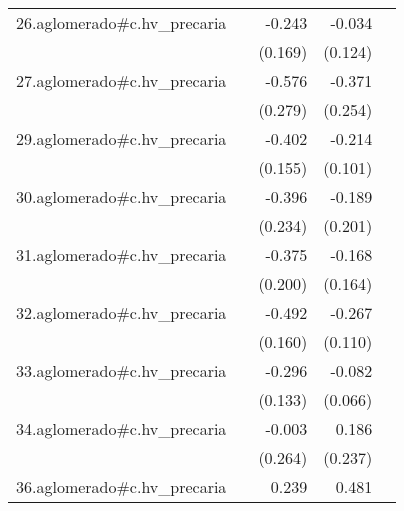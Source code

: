 {\begin{longtable}{l*{4}{D{.}{.}{-1}}}
\addlinespace
26.aglomerado#c.hv\_precaria&                     &      -0.243         &      -0.034         &                     \\
            &                     &     (0.169)         &     (0.124)         &                     \\
\addlinespace
27.aglomerado#c.hv\_precaria&                     &      -0.576\sym{*}  &      -0.371         &                     \\
            &                     &     (0.279)         &     (0.254)         &                     \\
\addlinespace
29.aglomerado#c.hv\_precaria&                     &      -0.402\sym{**} &      -0.214\sym{*}  &                     \\
            &                     &     (0.155)         &     (0.101)         &                     \\
\addlinespace
30.aglomerado#c.hv\_precaria&                     &      -0.396         &      -0.189         &                     \\
            &                     &     (0.234)         &     (0.201)         &                     \\
\addlinespace
31.aglomerado#c.hv\_precaria&                     &      -0.375         &      -0.168         &                     \\
            &                     &     (0.200)         &     (0.164)         &                     \\
\addlinespace
32.aglomerado#c.hv\_precaria&                     &      -0.492\sym{**} &      -0.267\sym{*}  &                     \\
            &                     &     (0.160)         &     (0.110)         &                     \\
\addlinespace
33.aglomerado#c.hv\_precaria&                     &      -0.296\sym{*}  &      -0.082         &                     \\
            &                     &     (0.133)         &     (0.066)         &                     \\
\addlinespace
34.aglomerado#c.hv\_precaria&                     &      -0.003         &       0.186         &                     \\
            &                     &     (0.264)         &     (0.237)         &                     \\
\addlinespace
36.aglomerado#c.hv\_precaria&                     &       0.239         &       0.481\sym{*}  &                     \\

\end{longtable}}
